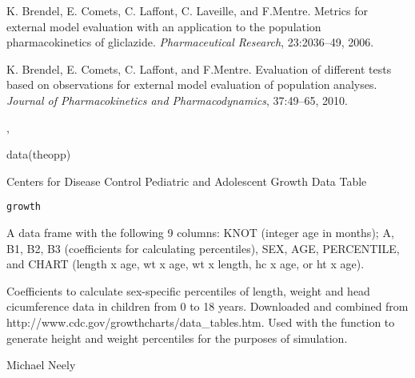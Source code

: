 \documentclass[a4paper]{book}
\begin{document}
%
\begin{References}\relax
K. Brendel, E. Comets, C. Laffont, C. Laveille, and F.Mentre. Metrics for external model evaluation with an application to the population pharmacokinetics of gliclazide. \emph{Pharmaceutical Research}, 23:2036--49, 2006.

K. Brendel, E. Comets, C. Laffont, and F.Mentre. Evaluation of different tests based on observations for external model evaluation of  population analyses. \emph{Journal of Pharmacokinetics and Pharmacodynamics}, 37:49--65, 2010.
\end{References}
%
\begin{SeeAlso}\relax
{}, 
\end{SeeAlso}
%
\begin{Examples}
\begin{ExampleCode}

data(theopp)

\end{ExampleCode}
\end{Examples}
%
\begin{Description}\relax
Centers for Disease Control Pediatric and Adolescent Growth Data Table
\end{Description}
%
\begin{Usage}
\begin{verbatim}
growth
\end{verbatim}
\end{Usage}
%
\begin{Format}
A data frame with the following 9 columns: KNOT (integer age in months); A, B1, B2, B3 (coefficients for calculating
percentiles), SEX, AGE, PERCENTILE, and CHART (length x age, wt x age, wt x length, hc x age, or ht x age).
\end{Format}
%
\begin{Details}\relax
Coefficients to calculate sex-specific percentiles of length, weight and head cicumference data 
in children from 0 to 18 years.  Downloaded and combined from http://www.cdc.gov/growthcharts/data\_tables.htm.
Used with the  function to generate height and weight percentiles for the purposes of simulation.
\end{Details}
%
\begin{Author}\relax
Michael Neely
\end{Author}
\end{document}
